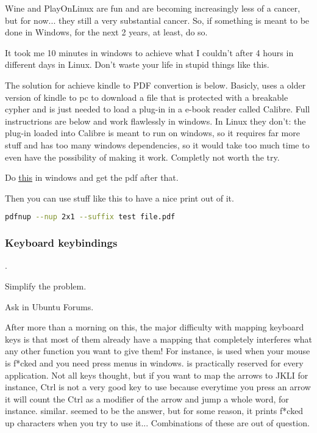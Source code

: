 \par {} Wine and PlayOnLinux are fun and are becoming increasingly less of a cancer, but for now... they still a very substantial cancer. So, if something is meant to be done in Windows, for the next 2 years, at least, do so. 

\par It took me 10 minutes in windows to achieve what I couldn't after 4 hours in different days in Linux. Don't waste your life in stupid things like this.

\par The solution for achieve kindle to PDF convertion is below. Basicly, uses a older version of kindle to pc to download a file that is protected with a breakable cypher and is just needed to load a plug-in in a e-book reader called Calibre. Full instructrions are below and work flawlessly in windows. In Linux they don't: the plug-in loaded into Calibre is meant to run on windows, so it requires far more stuff and has too many windows dependencies, so it would take too much time to even have the possibility of making it work. Completly not worth the try.

\par Do \href{https://askubuntu.com/questions/1011989/where-are-amazon-kindle-ebooks-on-my-linux-pc-after-i-download-them-for-offline/1012193#1012193}{\ul{this}} in windows and get the pdf after that.

\par Then you can use stuff like this to have a nice print out of it.
\begin{lstlisting}[language=bash]
    pdfnup --nup 2x1 --suffix test file.pdf
\end{lstlisting}


\subsubsection{Keyboard keybindings} \label{sec:linux_life_lessons_keybindings}

{\large {}. \par Simplify the problem. \par Ask in Ubuntu Forums.}

\par After more than a morning on this, the major difficulty with mapping keyboard keys is that most of them already have a mapping that completely interferes what any other function you want to give them! For instance,  is used when your mouse is f*cked and you need press menus in windows.  is practically reserved for every application. Not all keys thought, but if you want to map the arrows to JKLI for instance, Ctrl is not a very good key to use because everytime you press an arrow it will count the Ctrl as a modifier of the arrow and jump a whole word, for instance.  similar.  seemed to be the answer, but for some reason, it prints f*cked up characters when you try to use it... Combinations of these are out of question. 

